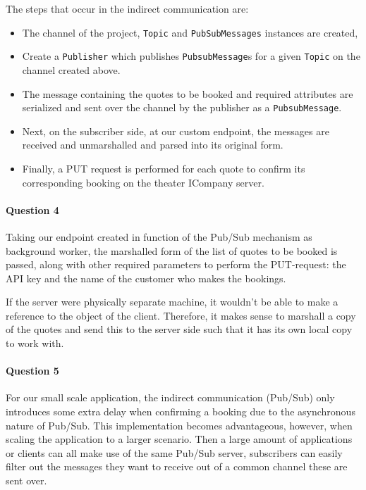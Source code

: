 \documentclass{ds-report}
\begin{document}
	The steps that occur in the indirect communication are:
	 \begin{itemize}
	 	\item The channel of the project, \texttt{Topic} and \texttt{PubSubMessages} instances are created,
	 	\item Create a \texttt{Publisher} which publishes \texttt{PubsubMessage}s for a given \texttt{Topic} on the channel created above.
	 	\item The message containing the quotes to be booked and required attributes are serialized and sent over the channel by the publisher as a \texttt{PubsubMessage}.
	 	\item Next, on the subscriber side, at our custom endpoint, the messages are received and unmarshalled and parsed into its original form.
	 	\item Finally, a PUT request is performed for each quote to confirm its corresponding booking on the theater ICompany server.
	 \end{itemize}
 
 	\paragraph{Question 4}
 	Taking our endpoint created in function of the Pub/Sub mechanism as background worker, the marshalled form of the list of quotes to be booked is passed, along with other required parameters to perform the PUT-request: the API key and the name of the customer who makes the bookings. 
 	
 	If the server were physically separate machine, it wouldn't be able to make a reference to the object of the client. Therefore, it makes sense to marshall a copy of the quotes and send this to the server side such that it has its own local copy to work with.
	
	\paragraph{Question 5}
	For our small scale application, the indirect communication (Pub/Sub) only introduces some extra delay when confirming a booking due to the asynchronous nature of Pub/Sub. This implementation becomes advantageous, however, when scaling the application to a larger scenario. Then a large amount of applications or clients can all make use of the same Pub/Sub server, subscribers can easily filter out the messages they want to receive out of a common channel these are sent over.
	
\end{document}
